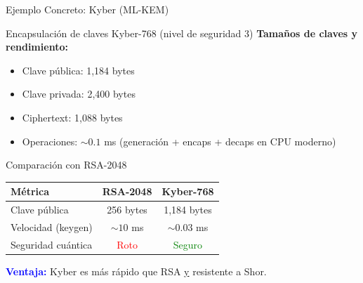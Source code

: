 \documentclass[aspectratio=169]{beamer}
\begin{document}
\begin{frame}{Ejemplo Concreto: Kyber (ML-KEM)}
\small
\begin{exampleblock}{Encapsulación de claves Kyber-768 (nivel de seguridad 3)}
\textbf{Tamaños de claves y rendimiento:}
\begin{itemize}
\item Clave pública: 1,184 bytes
\item Clave privada: 2,400 bytes
\item Ciphertext: 1,088 bytes
\item Operaciones: $\sim 0.1$ ms (generación + encaps + decaps en CPU moderno)
\end{itemize}
\end{exampleblock}

\vspace{0.15cm}
\begin{exampleblock}{Comparación con RSA-2048}
\begin{center}
\begin{tabular}{|l|c|c|}
\hline
\textbf{Métrica} & \textbf{RSA-2048} & \textbf{Kyber-768} \\
\hline
Clave pública & 256 bytes & 1,184 bytes \\
Velocidad (keygen) & $\sim 10$ ms & $\sim 0.03$ ms \\
Seguridad cuántica & \textcolor{red}{Roto} & \textcolor{green}{Seguro} \\
\hline
\end{tabular}
\end{center}
\end{exampleblock}

\textcolor{blue}{\textbf{Ventaja:}} Kyber es más rápido que RSA \underline{y} resistente a Shor.
\end{frame}
\end{document}
